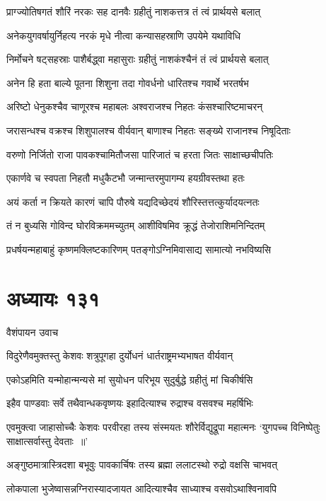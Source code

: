 \twolineshloka
{प्राग्ज्योतिषगतं शौरिं नरकः सह दानवैः}
{ग्रहीतुं नाशकत्तत्र तं त्वं प्रार्थयसे बलात्}


\twolineshloka
{अनेकयुगवर्षायुर्निहत्य नरकं मृधे}
{नीत्वा कन्यासहस्राणि उपयेमे यथाविधि}


\twolineshloka
{निर्मोचने षट्सहस्राः पाशैर्बद्ध्वा महासुराः}
{ग्रहीतुं नाशकंश्चैनं तं त्वं प्रार्थयसे बलात्}


\twolineshloka
{अनेन हि हता बाल्ये पूतना शिशुना तदा}
{गोवर्धनो धारितश्च गवार्थे भरतर्षभ}


\twolineshloka
{अरिष्टो धेनुकश्चैव चाणूरश्च महाबलः}
{अश्वराजश्च निहतः कंसश्चारिष्टमाचरन्}


\twolineshloka
{जरासन्धश्च वक्रश्च शिशुपालश्च वीर्यवान्}
{बाणाश्च निहतः सङ्ख्ये राजानश्च निषूदिताः}


\twolineshloka
{वरुणो निर्जितो राजा पावकश्चामितौजसा}
{पारिजातं च हरता जितः साक्षाच्छचीपतिः}


\twolineshloka
{एकार्णवे च स्वपता निहतौ मधुकैटभौ}
{जन्मान्तरमुपागम्य हयग्रीवस्तथा हतः}


\twolineshloka
{अयं कर्ता न क्रियते कारणं चापि पौरुषे}
{यद्यदिच्छेदयं शौरिस्तत्तत्कुर्यादयत्नतः}


\twolineshloka
{तं न बुध्यसि गोविन्द घोरविक्रममच्युतम्}
{आशीविषमिव क्रूद्धं तेजोराशिमनिन्दितम्}


\twolineshloka
{प्रधर्षयन्महाबाहुं कृष्णमक्लिष्टकारिणम्}
{पतङ्गोऽग्निमिवासाद्य सामात्यो नभविष्यसि}


\chapter{अध्यायः १३१}
\twolineshloka
{वैशंपायन उवाच}
{}


\twolineshloka
{विदुरेणैवमुक्तस्तु केशवः शत्रुपूगहा}
{दुर्योधनं धार्तराष्ट्रमभ्यभाषत वीर्यवान्}


\twolineshloka
{एकोऽहमिति यन्मोहान्मन्यसे मां सुयोधन}
{परिभूय सुदुर्बुद्धे ग्रहीतुं मां चिकीर्षसि}


\twolineshloka
{इहैव पाण्डवाः सर्वे तथैवान्धकवृष्णयः}
{इहादित्याश्च रुद्राश्च वसवश्च महर्षिभिः}


\threelineshloka
{एवमुक्त्वा जाहासोच्चैः केशवः परवीरहा}
{तस्य संस्मयतः शौरेर्विद्युद्रूपा महात्मनः}
{`युगपच्च विनिष्पेतुः साक्षात्सर्वास्तु देवताः ॥'}


\twolineshloka
{अङ्गुष्ठमात्रास्त्रिदशा बभूवुः पावकार्चिषः}
{तस्य ब्रह्मा ललाटस्थो रुद्रो वक्षसि चाभवत्}


\twolineshloka
{लोकपाला भुजेष्वासन्नग्निरास्यादजायत}
{आदित्याश्चैव साध्याश्च वसवोऽथाश्विनावपि}


